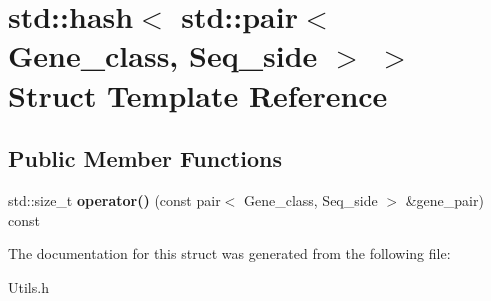 \hypertarget{structstd_1_1hash_3_01std_1_1pair_3_01Gene__class_00_01Seq__side_01_4_01_4}{}\section{std\+:\+:hash$<$ std\+:\+:pair$<$ Gene\+\_\+class, Seq\+\_\+side $>$ $>$ Struct Template Reference}
\label{structstd_1_1hash_3_01std_1_1pair_3_01Gene__class_00_01Seq__side_01_4_01_4}
\subsection*{Public Member Functions}
\begin{DoxyCompactItemize}
\item 
\mbox{\label{structstd_1_1hash_3_01std_1_1pair_3_01Gene__class_00_01Seq__side_01_4_01_4_add84b6cd1e914b4830036b50688fe4bf}} 
std\+::size\+\_\+t {\bfseries operator()} (const pair$<$ Gene\+\_\+class, Seq\+\_\+side $>$ \&gene\+\_\+pair) const
\end{DoxyCompactItemize}


The documentation for this struct was generated from the following file\+:\begin{DoxyCompactItemize}
\item 
Utils.\+h\end{DoxyCompactItemize}
